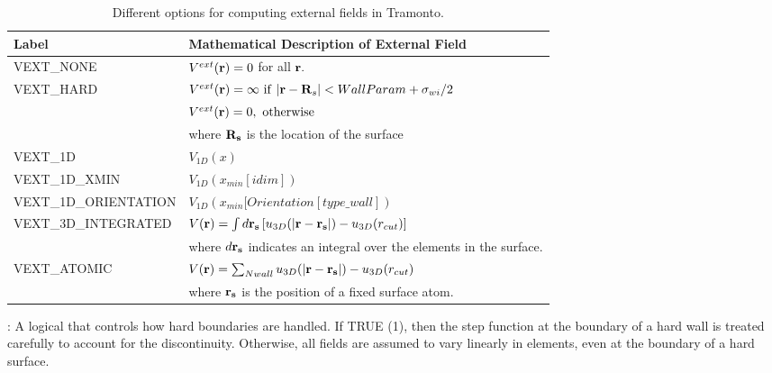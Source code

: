 \documentclass[10pt,onecolumn]{article}
\begin{document}
\begin{table}[h]
\center\begin{tabular}{|l|l|} \hline
Label & Mathematical Description of External Field \\ \hline 
VEXT\_NONE & $ V^{ext}({\bf r})=0$ for all ${\bf r}.$  \\ \hline
VEXT\_HARD & $ V^{ext}({\bf r})=\infty \ \mathrm{if} \ |{\bf r}-{\bf R}_s| < WallParam+\sigma_{wi}/2$  \\
 & $V^{ext}({\bf r})=0,  \ \mathrm{otherwise}$ \\  
  & where ${\bf R_s}$ is the location of the surface \\ \hline
 VEXT\_1D & $V_{1D}(x)$ \\ \hline
 VEXT\_1D\_XMIN & $V_{1D}(x_{min}[idim])$ \\ \hline
 VEXT\_1D\_ORIENTATION & $V_{1D}(x_{min}[Orientation[type\_wall])$ \\ \hline
 VEXT\_3D\_INTEGRATED & $V({\bf r})=\int d{\bf r_s} \left[u_{3D}(|{\bf r- r_s}|)-u_{3D}(r_{cut})   \right]$ \\
&  where $d{\bf r_s}$ indicates an integral over the elements in the surface. \\ \hline
VEXT\_ATOMIC & $V({\bf r})=\sum_{Nwall} u_{3D}(|{\bf r- r_s}|)-u_{3D}(r_{cut})$ \\
& where ${\bf r_s}$ is the position of a fixed surface atom. \\ \hline
 \end{tabular}
\caption{Different options for computing external fields in Tramonto.}
\label{tab:vexttable1}
\end{table}

\noindent\dotfill

\vspace{0.1in}
\vspace{0.1in}
:  A logical that controls how hard boundaries are handled.  If TRUE (1), then the step function at the boundary of a hard wall is treated carefully to account for the discontinuity.  Otherwise, all fields are assumed to vary linearly in elements, even at the boundary of a hard surface.

\noindent\dotfill
\end{document}
